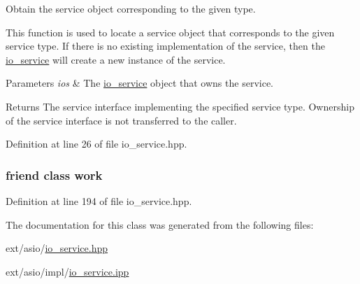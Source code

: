 Obtain the service object corresponding to the given type. 

This function is used to locate a service object that corresponds to the given service type. If there is no existing implementation of the service, then the \hyperlink{classasio_1_1io__service}{io\+\_\+service} will create a new instance of the service.


\begin{DoxyParams}{Parameters}
{\em ios} & The \hyperlink{classasio_1_1io__service}{io\+\_\+service} object that owns the service.\\
\hline
\end{DoxyParams}
\begin{DoxyReturn}{Returns}
The service interface implementing the specified service type. Ownership of the service interface is not transferred to the caller. 
\end{DoxyReturn}


Definition at line 26 of file io\+\_\+service.\+hpp.

\hypertarget{classasio_1_1io__service_ab4659d3bc91cdcd7ca7a05329278ee88}{}
\subsubsection[{work}]{\setlength{\rightskip}{0pt plus 5cm}friend class {\bf work}\hspace{0.3cm}{\ttfamily [friend]}}\label{classasio_1_1io__service_ab4659d3bc91cdcd7ca7a05329278ee88}


Definition at line 194 of file io\+\_\+service.\+hpp.



The documentation for this class was generated from the following files\+:\begin{DoxyCompactItemize}
\item 
ext/asio/\hyperlink{io__service_8hpp}{io\+\_\+service.\+hpp}\item 
ext/asio/impl/\hyperlink{io__service_8ipp}{io\+\_\+service.\+ipp}\end{DoxyCompactItemize}
